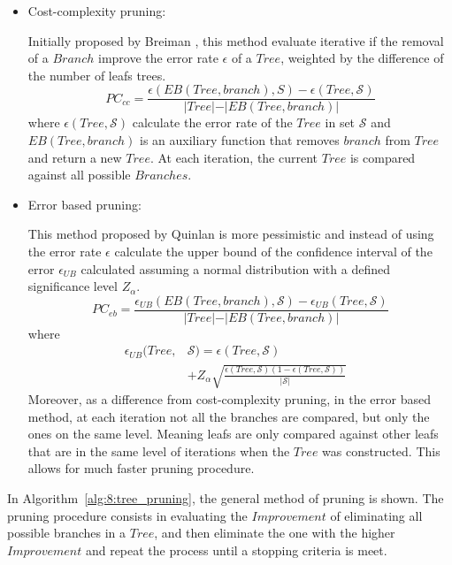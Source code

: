 \begin{itemize}
\item Cost-complexity pruning:
  
Initially proposed by Breiman  \citep{Breiman1984a}, this method evaluate iterative if the removal 
of a $Branch$ improve the error rate $\epsilon$ of a $Tree$, weighted by the difference of the 
number of leafs trees.
\begin{equation}\label{eq:8:pruning}
PC_{cc} = \frac{\epsilon(EB(Tree,branch),S)-\epsilon(Tree,\mathcal{S}) }
{\vert Tree\vert-\vert EB(Tree,branch)\vert}
\end{equation} 
where $\epsilon(Tree,\mathcal{S})$ calculate the error rate of the $Tree$ in set $\mathcal{S}$ and 
$EB(Tree,branch)$ is an auxiliary function that removes $branch$ from $Tree$ and return a new 
$Tree$. At each iteration, the current $Tree$ is compared against all possible $Branches$.
    
\item Error based pruning:
  
This method proposed by Quinlan  \citep{Quinlan1992} is more pessimistic and instead of  using the 
error rate $\epsilon$ calculate the upper bound of the confidence interval   of the error 
$\epsilon_{UB}$ calculated assuming a normal distribution with a defined significance level 
$Z_\alpha$.
\begin{equation}
PC_{eb} = \frac{\epsilon_{UB}(EB(Tree,branch),\mathcal{S})-\epsilon_{UB}(Tree,\mathcal{S}) }
    {\vert Tree\vert-\vert EB(Tree,branch)\vert}
\end{equation} 
where 
\begin{align}
    \epsilon_{UB}(Tree,&\mathcal{S})= \epsilon(Tree,\mathcal{S}) & \nonumber \\
    &+Z_\alpha \sqrt{  
\frac{\epsilon(Tree,\mathcal{S})(1-\epsilon(Tree,\mathcal{S}))}{\vert \mathcal{S} \vert}} &
\end{align}   
Moreover, as a difference from cost-complexity pruning, in the error based method, at each 
iteration not all the branches are compared, but only the ones on the same level. Meaning leafs 
are only compared against other leafs that are in the same level of iterations when the $Tree$ 
was constructed. This allows for much faster pruning procedure.
\end{itemize}

In Algorithm~\ref{alg:8:tree_pruning}, the general method of pruning is shown. The pruning 
procedure consists in evaluating the $Improvement$ of eliminating all possible branches in a 
$Tree$, 
and then eliminate the one with the higher $Improvement$ and repeat the process until a stopping 
criteria is meet.


